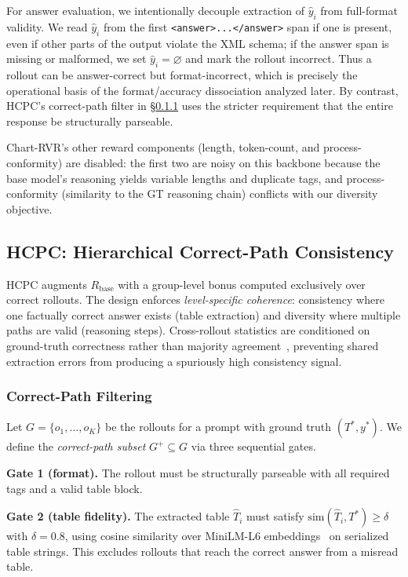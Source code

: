\documentclass[11pt]{article}
\begin{document}
For answer evaluation, we intentionally decouple extraction of
$\hat{y}_i$ from full-format validity. We read $\hat{y}_i$ from the
first \texttt{<answer>...</answer>} span if one is present, even if
other parts of the output violate the XML schema; if the answer span
is missing or malformed, we set $\hat{y}_i{=}\varnothing$ and mark the
rollout incorrect. Thus a rollout can be answer-correct but
format-incorrect, which is precisely the operational basis of the
format/accuracy dissociation analyzed later. By contrast, HCPC's
correct-path filter in \S\ref{sec:cpf} uses the stricter requirement
that the entire response be structurally parseable.

Chart-RVR's other reward components (length, token-count, and
process-conformity) are disabled: the first two are noisy on this
backbone because the base model's reasoning yields variable lengths
and duplicate tags, and process-conformity (similarity to the GT
reasoning chain) conflicts with our diversity objective.

\subsection{HCPC: Hierarchical Correct-Path Consistency}
\label{sec:hcpc}

HCPC augments $R_{\text{base}}$ with a group-level bonus computed
exclusively over correct rollouts. The design enforces
\emph{level-specific coherence}: consistency where one factually
correct answer exists (table extraction) and diversity where multiple
paths are valid (reasoning steps). Cross-rollout statistics are
conditioned on ground-truth correctness rather than majority
agreement~\citep{wang2022sc}, preventing shared extraction errors from
producing a spuriously high consistency signal.

\subsubsection{Correct-Path Filtering}
\label{sec:cpf}

Let $G = \{o_1, \dots, o_K\}$ be the rollouts for a prompt with
ground truth $(T^*, y^*)$. We define the \emph{correct-path
subset} $G^+ \subseteq G$ via three sequential gates.

\textbf{Gate 1 (format).} The rollout must be structurally parseable
with all required tags and a valid table block.

\textbf{Gate 2 (table fidelity).} The extracted table $\hat{T}_i$
must satisfy $\mathrm{sim}(\hat{T}_i, T^*) \ge \delta$ with
$\delta{=}0.8$, using cosine similarity over MiniLM-L6
embeddings~\citep{minilm} on serialized table strings. This excludes
rollouts that reach the correct answer from a misread table.
\end{document}
